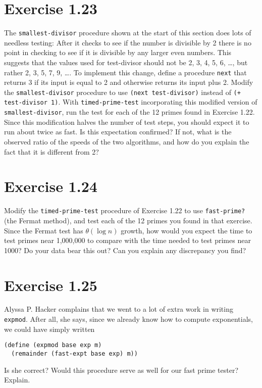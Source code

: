 \documentclass[11pt]{article}
\begin{document}
\section{Exercise 1.23}
\label{sec:org6ec17c4}
The \texttt{smallest-divisor} procedure shown at the start of this section does lots
of needless testing: After it checks to see if the number is divisible by 2
there is no point in checking to see if it is divisible by any larger even
numbers. This suggests that the values used for test-divisor should not be 2,
3, 4, 5, 6, \ldots{}, but rather 2, 3, 5, 7, 9, \ldots{}. To implement this change,
define a procedure \texttt{next} that returns 3 if its input is equal to 2 and
otherwise returns its input plus 2. Modify the \texttt{smallest-divisor} procedure to
use \texttt{(next test-divisor)} instead of \texttt{(+ test-divisor 1)}. With
\texttt{timed-prime-test} incorporating this modified version of \texttt{smallest-divisor},
run the test for each of the 12 primes found in Exercise 1.22. Since this
modification halves the number of test steps, you should expect it to run
about twice as fast. Is this expectation confirmed? If not, what is the
observed ratio of the speeds of the two algorithms, and how do you explain the
fact that it is different from 2?
\section{Exercise 1.24}
\label{sec:org0bdb459}
Modify the \texttt{timed-prime-test} procedure of Exercise 1.22 to use \texttt{fast-prime?}
(the Fermat method), and test each of the 12 primes you found in that
exercise. Since the Fermat test has \(\theta(\log n)\) growth, how would you
expect the time to test primes near 1,000,000 to compare with the time needed
to test primes near 1000? Do your data bear this out? Can you explain any
discrepancy you find?
\section{Exercise 1.25}
\label{sec:org361a3bc}
Alyssa P. Hacker complains that we went to a lot of extra work in writing
\texttt{expmod}. After all, she says, since we already know how to compute
exponentials, we could have simply written
\begin{verbatim}
(define (expmod base exp m)
  (remainder (fast-expt base exp) m))
\end{verbatim}
Is she correct? Would this procedure serve as well for our fast prime tester?
Explain.
\end{document}
